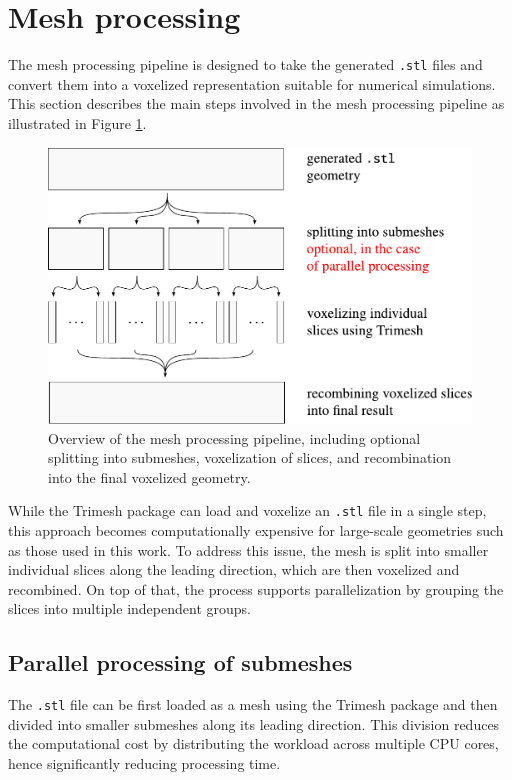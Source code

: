 \section{Mesh processing}\label{mesh}

The mesh processing pipeline is designed to take the generated  \texttt{.stl} files and convert them into a voxelized representation suitable for numerical simulations. This section describes the main steps involved in the mesh processing pipeline as illustrated in Figure \ref{fig:voxelizing}.

\begin{figure}[H]
	\centering
	\vspace{2mm}
	\includegraphics[width=.66\textwidth]{figures/voxelizing.pdf}
	\vspace{2mm}
	\caption{Overview of the mesh processing pipeline, including optional splitting into submeshes, voxelization of slices, and recombination into the final voxelized geometry.}
	\label{fig:voxelizing}
\end{figure}

While the Trimesh package can load and voxelize an \texttt{.stl} file in a single step, this approach becomes computationally expensive for large-scale geometries such as those used in this work. To address this issue, the mesh is split into smaller individual slices along the leading direction, which are then voxelized and recombined. On top of that, the process supports parallelization by grouping the slices into multiple independent groups.

\subsection{Parallel processing of submeshes}\label{parallelization}
 The \texttt{.stl} file can be first loaded as a mesh using the Trimesh package and then divided into smaller submeshes along its leading direction. This division reduces the computational cost by distributing the workload across multiple CPU cores, hence significantly reducing processing time.

